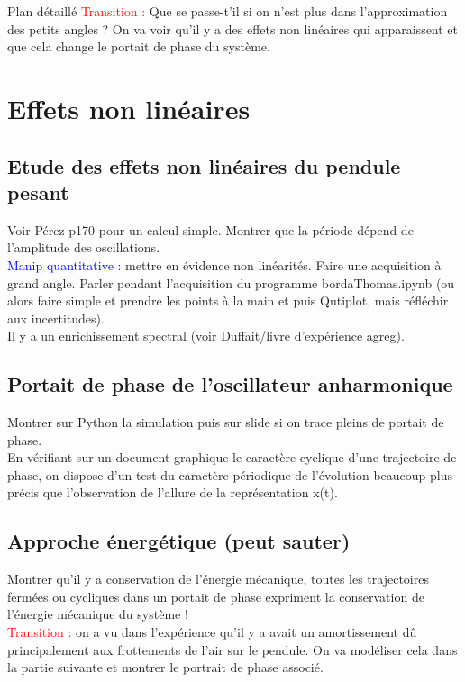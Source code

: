 \begin{reportBlock}{Plan détaillé}
  \textcolor{red}{Transition :} Que se passe-t'il si on n'est plus dans l'approximation des petits angles ? On va voir qu'il y a des effets non linéaires qui apparaissent et que cela change le portait de phase du système.

  \section{Effets non linéaires}
  \subsection{Etude des effets non linéaires du pendule pesant}
  Voir Pérez p170 pour un calcul simple. Montrer que la période dépend de l'amplitude des oscillations.\\
  \textcolor{blue}{Manip quantitative :} mettre en évidence non linéarités. Faire une acquisition à grand angle. Parler pendant l'acquisition du programme bordaThomas.ipynb (ou alors faire simple et prendre les points à la main et puis Qutiplot, mais réfléchir aux incertitudes).\\
  Il y a un enrichissement spectral (voir Duffait/livre d'expérience agreg).

  \subsection{Portait de phase de l'oscillateur anharmonique}
  Montrer sur Python la simulation puis sur slide si on trace pleins de portait de phase.\\
  En vérifiant sur un document graphique le caractère cyclique d’une trajectoire de phase, on dispose d’un test du caractère périodique de l’évolution beaucoup plus précis que l’observation de l’allure de la représentation x(t).
  
  \subsection{Approche énergétique (peut sauter)}
  Montrer qu'il y a conservation de l'énergie mécanique, toutes les trajectoires fermées ou cycliques dans un portait de phase expriment la conservation de l'énergie mécanique du système !\\

  \textcolor{red}{Transition :} on a vu dans l'expérience qu'il y a avait un amortissement dû principalement aux frottements de l'air sur le pendule. On va modéliser cela dans la partie suivante et montrer le portrait de phase associé.
  

\end{reportBlock}
